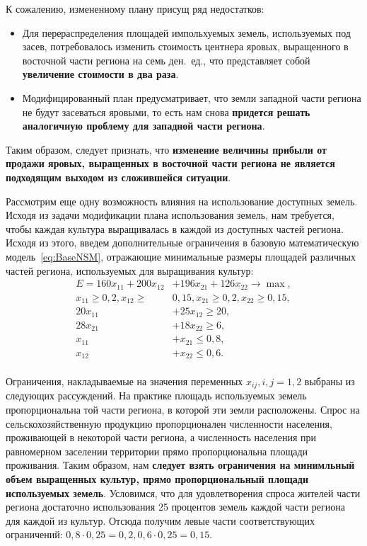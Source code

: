 К сожалению, измененному плану присущ ряд недостатков:
\begin{itemize}
\item Для перераспределения площадей импольхуемых земель, используемых под засев, потребовалось изменить 
  стоимость центнера яровых, выращенного в восточной части региона на семь ден.~ед., что представляет
  собой \textbf{увеличение стоимости в два раза}.
\item Модифицированный план предусматривает, что земли западной части региона не будут 
    засеваться яровыми, то есть нам снова \textbf{придется решать аналогичную проблему для западной части региона}.
\end{itemize}

Таким образом, следует признать, что \textbf{изменение величины прибыли от продажи яровых, выращенных в восточной
части региона не является подходящим выходом из сложившейся ситуации}. 

Рассмотрим еще одну возможность влияния на использование доступных земель.
Исходя из задачи модификации плана использования земель, нам требуется, чтобы каждая культура выращивалась
в каждой из доступных частей региона. Исходя из этого, введем дополнительные ограничения в базовую математическую
модель~\eqref{eq:BaseNSM}, отражающие минимальные размеры площадей различных частей региона, используемых для выращивания культур:
\begin{equation}
  \label{eq:ModifiedNSM}
    \begin{aligned}
      E = 160x_{11} + 200x_{12} &+ 196x_{21} + 126x_{22} \rightarrow \max, \\
      x_{11} \ge 0{,}2, x_{12} \ge &0{,}15, x_{21} \ge 0{,}2, x_{22} \ge 0{,}15, \\
      20x_{11} &+ 25x_{12} \ge 20, \\
      28x_{21} &+ 18x_{22} \ge 6, \\
      x_{11} &+ x_{21} \le 0{,}8, \\
      x_{12} &+ x_{22} \le 0{,}6. \\
    \end{aligned}
\end{equation}

Ограничения, накладываемые на значения переменных $ x_{ij}, i{,}j = 1,2 $ выбраны из следующих рассуждений.
На практике площадь используемых земель пропорциональна той части региона, в которой эти земли расположены.
Спрос на сельскохозяйственную продукцию пропорционален численности населения, проживающей в некоторой части 
региона, а численность населения при равномерном заселении территории прямо пропорциональна площади проживания.
Таким образом, нам \textbf{следует взять ограничения на минимльный объем выращенных культур, прямо
  пропорциональный площади используемых земель}. Условимся, что для удовлетворения спроса жителей части
региона достаточно использования 25 процентов земель каждой части региона для каждой из культур.
Отсюда получим левые части соответствующих ограничений:
$ 0{,}8 \cdot 0,25 = 0{,}2, 0{,}6 \cdot 0,25 = 0{,}15 $. 

